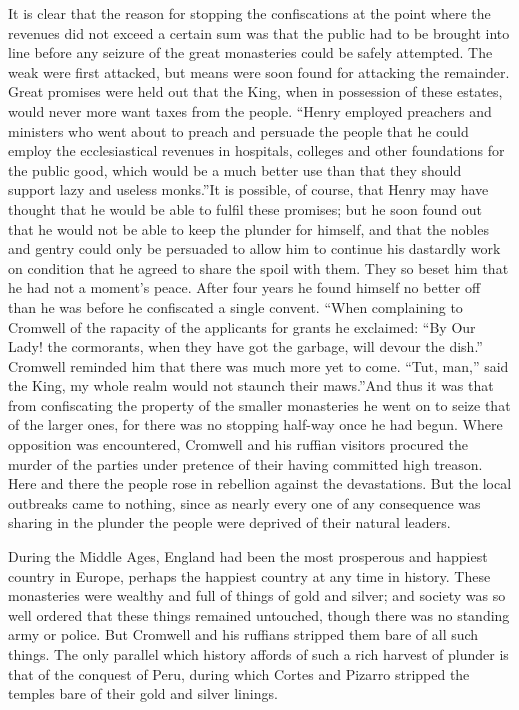 \documentclass{book}
\begin{document}
It is clear that the reason for stopping the confiscations at the point where the revenues did not exceed a certain sum was that the public had to be brought into line before any seizure of the great monasteries could be safely attempted. The weak were first attacked, but means were soon found for attacking the remainder. Great promises were held out that the King, when in possession of these estates, would never more want taxes from the people. “Henry employed preachers and ministers who went about to preach and persuade the people that he could employ the ecclesiastical revenues in hospitals, colleges and other foundations for the public good, which would be a much better use than that they should support lazy and useless monks.”\footnotemark[3] It is possible, of course, that Henry may have thought that he would be able to fulfil these promises; but he soon found out that he would not be able to keep the plunder for himself, and that the nobles and gentry could only be persuaded to allow him to continue his dastardly work on condition that he agreed to share the spoil with them. They so beset him that he had not a moment’s peace. After four years he found himself no better off than he was before he confiscated a single convent. “When complaining to Cromwell of the rapacity of the applicants for grants he exclaimed: “By Our Lady! the cormorants, when they have got the garbage, will devour the dish.” Cromwell reminded him that there was much more yet to come. “Tut, man,” said the King, my whole realm would not staunch their maws.”\footnotemark[4] And thus it was that from confiscating the property of the smaller monasteries he went on to seize that of the larger ones, for there was no stopping half-way once he had begun. Where opposition was encountered, Cromwell and his ruffian visitors procured the murder of the parties under pretence of their having committed high treason. Here and there the people rose in rebellion against the devastations. But the local outbreaks came to nothing, since as nearly every one of any consequence was sharing in the plunder the people were deprived of their natural leaders.

During the Middle Ages, England had been the most prosperous and happiest country in Europe, perhaps the happiest country at any time in history. These monasteries were wealthy and full of things of gold and silver; and society was so well ordered that these things remained untouched, though there was no standing army or police. But Cromwell and his ruffians stripped them bare of all such things. The only parallel which history affords of such a rich harvest of plunder is that of the conquest of Peru, during which Cortes and Pizarro stripped the temples bare of their gold and silver linings.
\end{document}
